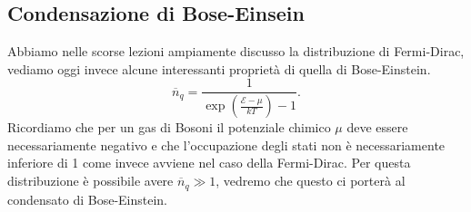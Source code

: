 \subsection{Condensazione di Bose-Einsein}%
Abbiamo nelle scorse lezioni ampiamente discusso la distribuzione di Fermi-Dirac, vediamo oggi invece alcune interessanti proprietà di quella di Bose-Einstein.
\[
	\overline{n}_{q} = \frac{1}{\exp\left( \frac{\mathcal{E} - \mu }{kT}\right)-1 }
.\]
Ricordiamo che per un gas di Bosoni il potenziale chimico $\mu $ deve essere necessariamente negativo e che l'occupazione degli stati non è necessariamente inferiore di 1 come invece avviene nel caso della Fermi-Dirac. Per questa distribuzione è possibile avere $\overline{n}_{q} \gg 1$, vedremo che questo ci porterà al condensato di Bose-Einstein.\\
